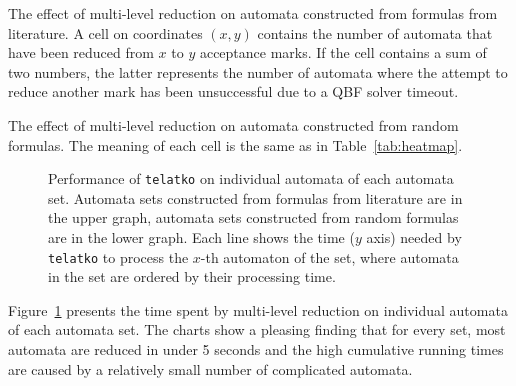 \documentclass[a4paper,UKenglish,cleveref,autoref,thm-restate]{lipics-v2021}
\newcommand{\telatko}{\texttt{telatko}\xspace}
\begin{document}
\begin{table}[t]
  \caption{The effect of multi-level reduction on automata constructed
    from formulas from literature.  A cell on coordinates $(x,y)$
    contains the number of automata that have been reduced from $x$ to
    $y$ acceptance marks. If the cell contains a sum of two numbers,
    the latter represents the number of automata where the attempt to
    reduce another mark has been unsuccessful due to a QBF solver
    timeout.}
\label{tab:heatmap}
\setlength{\tabcolsep}{2.5pt}
\centering

\end{table}

\begin{table}[t]
\caption{The effect of multi-level reduction on automata constructed
    from random formulas. The meaning of each cell is the same as in Table~\ref{tab:heatmap}.}
\label{tab:heatmap-random}
\setlength{\tabcolsep}{2.5pt}
\centering

\end{table}

\begin{figure}[p]
  \centering
  
  \bigskip\bigskip
  
  \bigskip
  \caption{Performance of \telatko on individual automata of each automata set.
    Automata sets constructed from formulas from literature are in the upper graph,
    automata sets constructed from random formulas are in the lower graph.
    Each line shows the time ($y$ axis) needed by \telatko to process the
    $x$-th automaton of the set, where automata in the set are ordered by
    their processing time.
  }
\label{fig:quantile}\end{figure}

Figure~\ref{fig:quantile} presents the time spent by multi-level
reduction on individual automata of each automata set. The charts
show a pleasing finding that for every set, most automata are reduced
in under 5 seconds and the high cumulative running times are caused by 
a relatively small number of complicated automata.

\end{document}
